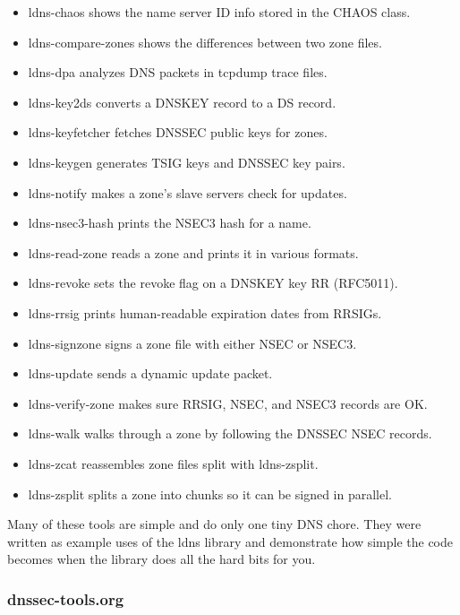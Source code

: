 \begin{itemize}
\item
  {ldns-chaos} shows the name server ID info stored in the CHAOS class.
\item
  {ldns-compare-zones} shows the differences between two zone files.
\item
  {ldns-dpa} analyzes DNS packets in {tcpdump} trace files.
\item
  {ldns-key2ds} converts a DNSKEY record to a DS record.
\item
  {ldns-keyfetcher} fetches DNSSEC public keys for zones.
\item
  {ldns-keygen} generates TSIG keys and DNSSEC key pairs.
\item
  {ldns-notify} makes a zone's slave servers check for updates.
\item
  {ldns-nsec3-hash} prints the NSEC3 hash for a name.
\item
  {ldns-read-zone} reads a zone and prints it in various formats.
\item
  {ldns-revoke} sets the revoke flag on a DNSKEY key RR (RFC5011).
\item
  {ldns-rrsig} prints human-readable expiration dates from RRSIGs.
\item
  {ldns-signzone} signs a zone file with either NSEC or NSEC3.
\item
  {ldns-update} sends a dynamic update packet.
\item
  {ldns-verify-zone} makes sure RRSIG, NSEC, and NSEC3 records are OK.
\item
  {ldns-walk} walks through a zone by following the DNSSEC NSEC records.
\item
  {ldns-zcat} reassembles zone files split with {ldns-zsplit}.
\item
  {ldns-zsplit} splits a zone into chunks so it can be signed in
  parallel.
\end{itemize}

Many of these tools are simple and do only one tiny DNS chore. They were
written as example uses of the {ldns} library and demonstrate how simple
the code becomes when the library does all the hard bits for you.

\subsubsection[dnssec-tools.org]{\texorpdfstring{\protect\hypertarget{part0024_split_067.htmlux5cux23_idTextAnchor950}{}{}dnssec-tools.org}{dnssec-tools.org}}

